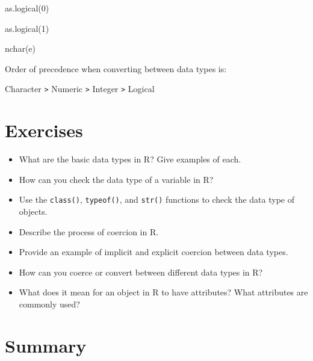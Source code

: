 \documentclass[
  letterpaper,
  DIV=11,
  numbers=noendperiod]{scrreprt}
\newenvironment{Shaded}{}{}
\newcommand{\DecValTok}[1]{\textcolor[rgb]{0.00,0.36,0.77}{#1}}
\newcommand{\FunctionTok}[1]{\textcolor[rgb]{0.44,0.26,0.76}{#1}}
\newcommand{\NormalTok}[1]{\textcolor[rgb]{0.14,0.16,0.18}{#1}}
\begin{document}
\begin{Shaded}
\begin{Highlighting}[]
\FunctionTok{as.logical}\NormalTok{(}\DecValTok{0}\NormalTok{)}
\end{Highlighting}
\end{Shaded}

\begin{Shaded}
\begin{Highlighting}[]
\FunctionTok{as.logical}\NormalTok{(}\DecValTok{1}\NormalTok{)}
\end{Highlighting}
\end{Shaded}

\begin{Shaded}
\begin{Highlighting}[]
\FunctionTok{nchar}\NormalTok{(e)}
\end{Highlighting}
\end{Shaded}

Order of precedence when converting between data types is:

Character \texttt{\textgreater{}} Numeric \texttt{\textgreater{}}
Integer \texttt{\textgreater{}} Logical

\section{Exercises}\label{exercises-7}

\begin{itemize}
\item
  What are the basic data types in R? Give examples of each.
\item
  How can you check the data type of a variable in R?
\item
  Use the \texttt{class()}, \texttt{typeof()}, and \texttt{str()}
  functions to check the data type of objects.
\item
  Describe the process of coercion in R.
\item
  Provide an example of implicit and explicit coercion between data
  types.
\item
  How can you coerce or convert between different data types in R?
\item
  What does it mean for an object in R to have attributes? What
  attributes are commonly used?
\end{itemize}

\section{Summary}\label{summary-7}
\end{document}
